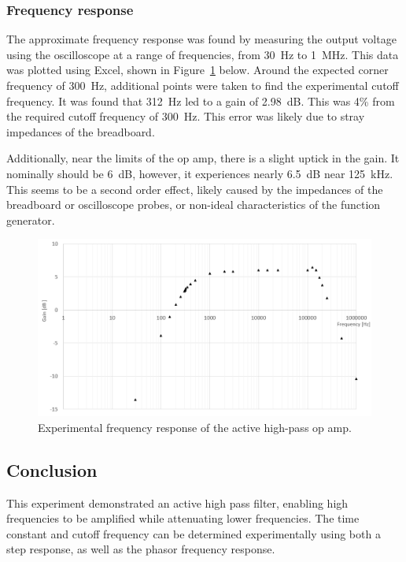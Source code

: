\documentclass{report}
\begin{document}
	\subsubsection{Frequency response}
	The approximate frequency response was found by measuring the output voltage using the oscilloscope at a range of frequencies, from \SI{30}{\Hz} to \SI{1}{\MHz}. This data was plotted using Excel, shown in Figure~\ref{fig:exp1bode} below. Around the expected corner frequency of \SI{300}{\Hz}, additional points were taken to find the experimental cutoff frequency. It was found that \SI{312}{\Hz} led to a gain of \SI{2.98}{\dB}. This was 4\% from the required cutoff frequency of \SI{300}{\Hz}. This error was likely due to stray impedances of the breadboard. 
	
	Additionally, near the limits of the op amp, there is a slight uptick in the gain. It nominally should be \SI{6}{\dB}, however, it experiences nearly \SI{6.5}{\dB} near \SI{125}{\kHz}. This seems to be a second order effect, likely caused by the impedances of the breadboard or oscilloscope probes, or non-ideal characteristics of the function generator.
	
	\begin{figure}[H]
		\centering
		\includegraphics[width=0.75\linewidth]{exp1bode}
		\caption{Experimental frequency response of the active high-pass op amp.}
		\label{fig:exp1bode}
	\end{figure}
	
	\subsection{Conclusion}
	This experiment demonstrated an active high pass filter, enabling high frequencies to be amplified while attenuating lower frequencies. The time constant and cutoff frequency can be determined experimentally using both a step response, as well as the phasor frequency response.
	
\end{document}
